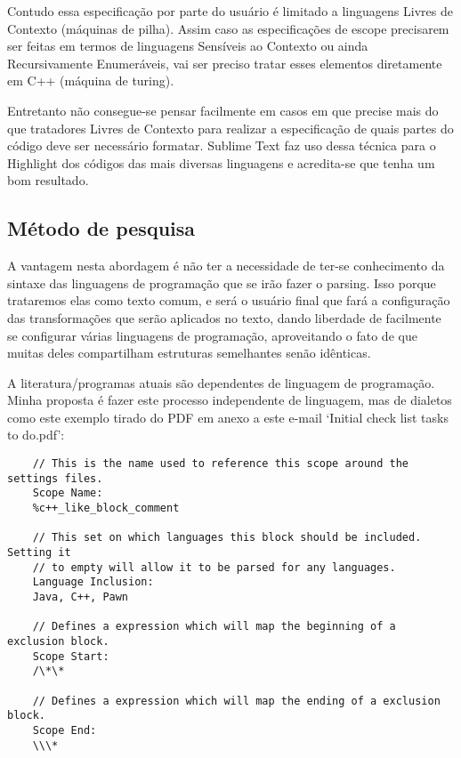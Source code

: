     Contudo essa especificação por parte do usuário é limitado a linguagens Livres de Contexto
    (máquinas de pilha). Assim caso as especificações de escope precisarem ser feitas em termos de
    linguagens Sensíveis ao Contexto ou ainda Recursivamente Enumeráveis, vai ser preciso tratar
    esses elementos diretamente em C++ (máquina de turing).

    Entretanto não consegue-se pensar facilmente em casos em que precise mais do que tratadores
    Livres de Contexto para realizar a especificação de quais partes do código deve ser necessário
    formatar. Sublime Text faz uso dessa técnica para o Highlight dos códigos das mais diversas
    linguagens e acredita-se que tenha um bom resultado.





\subsection{Método de pesquisa}

    A vantagem nesta abordagem é não ter a necessidade de ter-se conhecimento da sintaxe das
    linguagens de programação que se irão fazer o parsing. Isso porque trataremos elas como texto
    comum, e será o usuário final que fará a configuração das transformações que serão aplicados no
    texto, dando liberdade de facilmente se configurar várias linguagens de programação,
    aproveitando o fato de que muitas deles compartilham estruturas semelhantes senão idênticas.

    A literatura/programas atuais são dependentes de linguagem de programação. Minha proposta é
    fazer este processo independente de linguagem, mas de dialetos como este exemplo tirado do PDF
    em anexo a este e-mail `Initial check list tasks to do.pdf':

    \begin{lstlisting}
    // This is the name used to reference this scope around the settings files.
    Scope Name:
    %c++_like_block_comment

    // This set on which languages this block should be included. Setting it
    // to empty will allow it to be parsed for any languages.
    Language Inclusion:
    Java, C++, Pawn

    // Defines a expression which will map the beginning of a exclusion block.
    Scope Start:
    /\*\*

    // Defines a expression which will map the ending of a exclusion block.
    Scope End:
    \\\*
    \end{lstlisting}
    \vspace*{-4mm}

